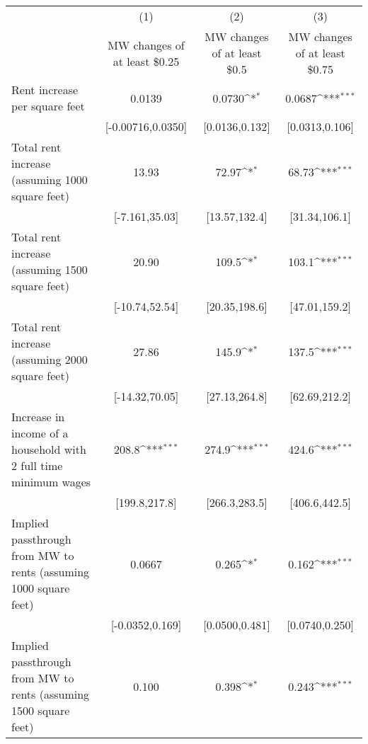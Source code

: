 {
\def\sym#1{\ifmmode^{#1}\else\(^{#1}\)\fi}
\begin{tabular}{l*{3}{c}}
\hline\hline
            &\multicolumn{1}{c}{(1)}        &\multicolumn{1}{c}{(2)}        &\multicolumn{1}{c}{(3)}        \\
            &\multicolumn{1}{c}{MW changes of at least \$0.25}&\multicolumn{1}{c}{MW changes of at least \$0.5}&\multicolumn{1}{c}{MW changes of at least \$0.75}\\
\hline
Rent increase per square feet&                0.0139         &                0.0730\sym{*}  &                0.0687\sym{***}\\
            &     [-0.00716,0.0350]         &        [0.0136,0.132]         &        [0.0313,0.106]         \\
[1em]
Total rent increase (assuming 1000 square feet)&                 13.93         &                 72.97\sym{*}  &                 68.73\sym{***}\\
            &        [-7.161,35.03]         &         [13.57,132.4]         &         [31.34,106.1]         \\
[1em]
Total rent increase (assuming 1500 square feet)&                 20.90         &                 109.5\sym{*}  &                 103.1\sym{***}\\
            &        [-10.74,52.54]         &         [20.35,198.6]         &         [47.01,159.2]         \\
[1em]
Total rent increase (assuming 2000 square feet)&                 27.86         &                 145.9\sym{*}  &                 137.5\sym{***}\\
            &        [-14.32,70.05]         &         [27.13,264.8]         &         [62.69,212.2]         \\
[1em]
Increase in income of a household with 2 full time minimum wages&                 208.8\sym{***}&                 274.9\sym{***}&                 424.6\sym{***}\\
            &         [199.8,217.8]         &         [266.3,283.5]         &         [406.6,442.5]         \\
[1em]
Implied passthrough from MW to rents (assuming 1000 square feet)&                0.0667         &                 0.265\sym{*}  &                 0.162\sym{***}\\
            &       [-0.0352,0.169]         &        [0.0500,0.481]         &        [0.0740,0.250]         \\
[1em]
Implied passthrough from MW to rents (assuming 1500 square feet)&                 0.100         &                 0.398\sym{*}  &                 0.243\sym{***}\\

\end{tabular}}
